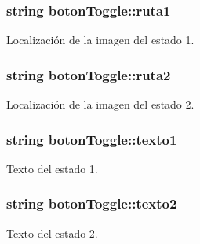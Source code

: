 \subsubsection[{ruta1}]{\setlength{\rightskip}{0pt plus 5cm}string boton\+Toggle\+::ruta1\hspace{0.3cm}{\ttfamily [private]}}\label{classboton_toggle_acd9a4699cc7fcb3facda61450bafa25f}


Localización de la imagen del estado 1. 

\hypertarget{classboton_toggle_a29e4c1705e45c20f62a77176b7b2ae2d}{}
\subsubsection[{ruta2}]{\setlength{\rightskip}{0pt plus 5cm}string boton\+Toggle\+::ruta2\hspace{0.3cm}{\ttfamily [private]}}\label{classboton_toggle_a29e4c1705e45c20f62a77176b7b2ae2d}


Localización de la imagen del estado 2. 

\hypertarget{classboton_toggle_abd3f33fb266429ad6697518506bedce8}{}
\subsubsection[{texto1}]{\setlength{\rightskip}{0pt plus 5cm}string boton\+Toggle\+::texto1\hspace{0.3cm}{\ttfamily [private]}}\label{classboton_toggle_abd3f33fb266429ad6697518506bedce8}


Texto del estado 1. 

\hypertarget{classboton_toggle_a838680f64548815ecac688f7bd3cb59c}{}
\subsubsection[{texto2}]{\setlength{\rightskip}{0pt plus 5cm}string boton\+Toggle\+::texto2\hspace{0.3cm}{\ttfamily [private]}}\label{classboton_toggle_a838680f64548815ecac688f7bd3cb59c}


Texto del estado 2. 

\hypertarget{classboton_toggle_a16e1fc2e8c6b3bfc76f1de28f9623740}{}

